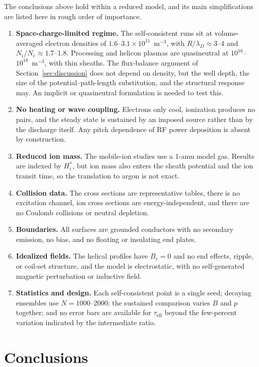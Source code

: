 \documentclass[11pt]{article}
\begin{document}
The conclusions above hold within a reduced model, and its main simplifications are listed here in rough order of importance.
\begin{enumerate}
  \item \textbf{Space-charge-limited regime.} The self-consistent runs sit at volume-averaged electron densities of $1.6$--$3.1\times10^{11}$~m$^{-3}$, with $R/\lambda_D \approx 3$--4 and $N_i/N_e \approx 1.7$--1.8. Processing and helicon plasmas are quasineutral at $10^{16}$--$10^{18}$~m$^{-3}$, with thin sheaths. The flux-balance argument of Section~\ref{sec:discussion} does not depend on density, but the well depth, the size of the potential--path-length substitution, and the structural response may. An implicit or quasineutral formulation is needed to test this.
  \item \textbf{No heating or wave coupling.} Electrons only cool, ionization produces no pairs, and the steady state is sustained by an imposed source rather than by the discharge itself. Any pitch dependence of RF power deposition is absent by construction.
  \item \textbf{Reduced ion mass.} The mobile-ion studies use a 1-amu model gas. Results are indexed by $H_i^*$, but ion mass also enters the sheath potential and the ion transit time, so the translation to argon is not exact.
  \item \textbf{Collision data.} The cross sections are representative tables, there is no excitation channel, ion cross sections are energy-independent, and there are no Coulomb collisions or neutral depletion.
  \item \textbf{Boundaries.} All surfaces are grounded conductors with no secondary emission, no bias, and no floating or insulating end plates.
  \item \textbf{Idealized fields.} The helical profiles have $B_r = 0$ and no end effects, ripple, or coil-set structure, and the model is electrostatic, with no self-generated magnetic perturbation or inductive field.
  \item \textbf{Statistics and design.} Each self-consistent point is a single seed; decaying ensembles use $N = 1000$--2000; the sustained comparison varies $B$ and $p$ together; and no error bars are available for $\tau_{\mathrm{eff}}$ beyond the few-percent variation indicated by the intermediate ratio.
\end{enumerate}

\section{Conclusions}
\label{sec:conclusions}
\end{document}
